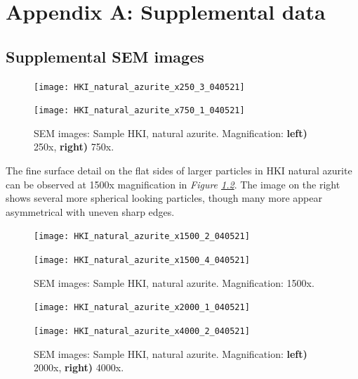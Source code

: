 \chapter{Appendix A: Supplemental data} 


\graphicspath{{Appendix1/Figs/Raster/}{Appendix1/Figs/PDF/}{Appendix1/Figs/}}


\section{Supplemental SEM images}


\begin{figure}[H]
\centering
\begin{minipage}{.45\textwidth}
  \centering
  \texttt{[image: HKI\_natural\_azurite\_x250\_3\_040521]}
\end{minipage}
\begin{minipage}{.45\textwidth}
  \centering
  \texttt{[image: HKI\_natural\_azurite\_x750\_1\_040521]}
\end{minipage}
\caption[SEM images: Sample HKI, natural azurite]{SEM images: Sample HKI, natural azurite. Magnification: \textbf{left)} 250x, \textbf{right)} 750x.}
\label{fig:hki_nat_az_sem_3}
\end{figure}

The fine surface detail on the flat sides of larger particles in HKI natural azurite can be observed at 1500x magnification in \textit{Figure \ref{fig:hki_nat_az_sem_4}}. The image on the right shows several more spherical looking particles, though many more appear asymmetrical with uneven sharp edges. 

\begin{figure}[H]
\centering
\begin{minipage}{.45\textwidth}
  \centering
  \texttt{[image: HKI\_natural\_azurite\_x1500\_2\_040521]}
\end{minipage}
\begin{minipage}{.45\textwidth}
  \centering
  \texttt{[image: HKI\_natural\_azurite\_x1500\_4\_040521]}
\end{minipage}
\caption[SEM images: Sample HKI, natural azurite]{SEM images: Sample HKI, natural azurite. Magnification: 1500x.}
\label{fig:hki_nat_az_sem_4}
\end{figure}

\begin{figure}[H]
\centering
\begin{minipage}{.45\textwidth}
  \centering
  \texttt{[image: HKI\_natural\_azurite\_x2000\_1\_040521]}
\end{minipage}
\begin{minipage}{.45\textwidth}
  \centering
  \texttt{[image: HKI\_natural\_azurite\_x4000\_2\_040521]}
\end{minipage}
\caption[SEM images: Sample HKI, natural azurite]{SEM images: Sample HKI, natural azurite. Magnification: \textbf{left)} 2000x, \textbf{right)} 4000x.}
\label{fig:hki_nat_az_sem_5}
\end{figure}

